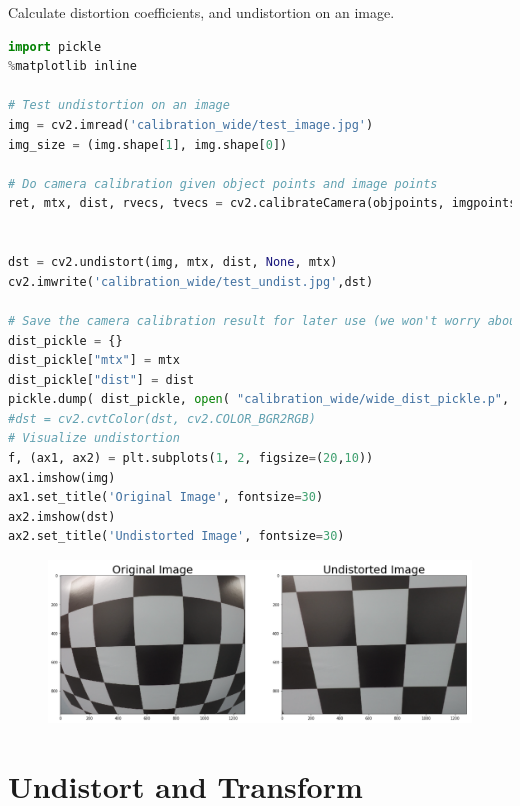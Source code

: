 \documentclass[12pt]{article}
\begin{document}
Calculate distortion coefficients, and undistortion on an image.
\begin{lstlisting}[language=Python]
import pickle
%matplotlib inline

# Test undistortion on an image
img = cv2.imread('calibration_wide/test_image.jpg')
img_size = (img.shape[1], img.shape[0])

# Do camera calibration given object points and image points
ret, mtx, dist, rvecs, tvecs = cv2.calibrateCamera(objpoints, imgpoints, img_size,None,None)


dst = cv2.undistort(img, mtx, dist, None, mtx)
cv2.imwrite('calibration_wide/test_undist.jpg',dst)

# Save the camera calibration result for later use (we won't worry about rvecs / tvecs)
dist_pickle = {}
dist_pickle["mtx"] = mtx
dist_pickle["dist"] = dist
pickle.dump( dist_pickle, open( "calibration_wide/wide_dist_pickle.p", "wb" ) )
#dst = cv2.cvtColor(dst, cv2.COLOR_BGR2RGB)
# Visualize undistortion
f, (ax1, ax2) = plt.subplots(1, 2, figsize=(20,10))
ax1.imshow(img)
ax1.set_title('Original Image', fontsize=30)
ax2.imshow(dst)
ax2.set_title('Undistorted Image', fontsize=30)
\end{lstlisting}

\begin{figure}[htp]
    \centering
    \includegraphics[width=15cm]{camera_calibration.png}
    \label{fig:camera_calibration}
\end{figure}

\section{Undistort and Transform}
\end{document}
